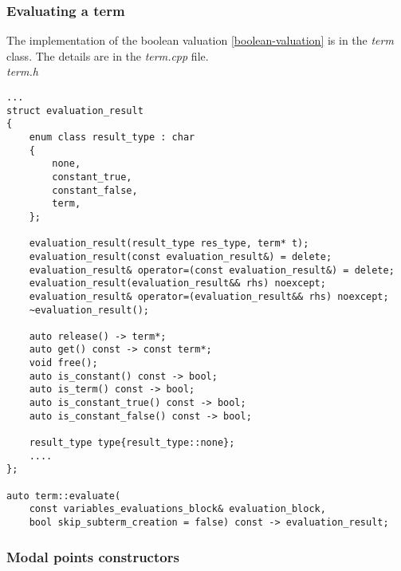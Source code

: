 \documentclass{article}
\begin{document}
	\newpage
	\subsubsection*{Evaluating a term}
	The implementation of the boolean valuation \ref{boolean-valuation} is in the \textit{term} class. The details are in the \textit{term.cpp} file.
\\
\noindent
\textit{term.h}
\begin{lstlisting}
...
struct evaluation_result
{
    enum class result_type : char
    {
        none,
        constant_true,
        constant_false,
        term,
    };

    evaluation_result(result_type res_type, term* t);
    evaluation_result(const evaluation_result&) = delete;
    evaluation_result& operator=(const evaluation_result&) = delete;
    evaluation_result(evaluation_result&& rhs) noexcept;
    evaluation_result& operator=(evaluation_result&& rhs) noexcept;
    ~evaluation_result();

    auto release() -> term*;
    auto get() const -> const term*;
    void free();
    auto is_constant() const -> bool;
    auto is_term() const -> bool;
    auto is_constant_true() const -> bool;
    auto is_constant_false() const -> bool;

    result_type type{result_type::none};
	....
};

auto term::evaluate(
	const variables_evaluations_block& evaluation_block,
	bool skip_subterm_creation = false) const -> evaluation_result;
\end{lstlisting}

	\newpage
	\subsubsection*{Modal points constructors}
\end{document}
